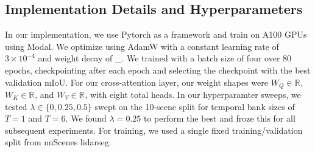 \documentclass[10pt,twocolumn,letterpaper]{article}
\begin{document}
\subsection{Implementation Details and Hyperparameters}
In our implementation, we use Pytorch as a framework and train on A100 GPUs using Modal. We optimize using AdamW with a constant learning rate of $3 \times 10^{-4}$ and weight decay of \_. We trained with a batch size of four over 80 epochs, checkpointing after each epoch and selecting the checkpoint with the best validation mIoU. For our cross-attention layer, our weight shapes were $W_Q \in \mathbb{R}^{}$, $W_K \in \mathbb{R}^{}$, and $W_V \in \mathbb{R}^{}$, with eight total heads. In our hyperparamter sweeps, we tested $\lambda \in \{0, 0.25, 0.5\}$ swept on the 10-scene split for temporal bank sizes of $T=1$ and $T=6$. We found $\lambda = 0.25$ to perform the best and froze this for all subsequent experiments. For training, we used a single fixed training/validation split from nuScenes lidarseg.

\end{document}
